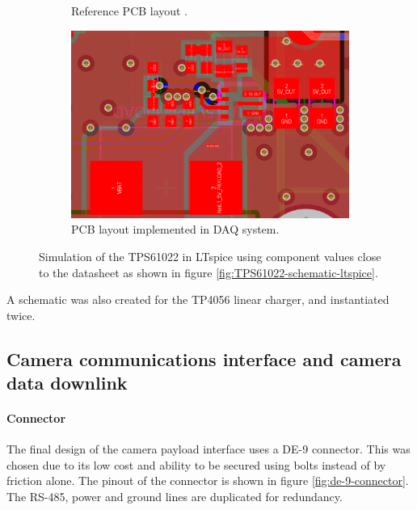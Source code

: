 \documentclass[a4paper,11pt]{article}
\begin{document}
\begin{figure}[H]
  \begin{subfigure}{.5\textwidth}
    \centering
    
    \caption{Reference PCB layout \cite{ti2021tps61022}.}
  \end{subfigure}
  \begin{subfigure}{.5\textwidth}
    \centering
    \includegraphics[width=\linewidth]{images/TPS61022-pcb-layout.svg.png}
    \caption{PCB layout implemented in DAQ system.}
  \end{subfigure}
  \caption{Simulation of the TPS61022 in LTspice using component values close to the datasheet as shown in figure \ref{fig:TPS61022-schematic-ltspice}.}
  \label{fig:TPS61022-layout}
\end{figure}

A schematic was also created for the TP4056 linear charger, and instantiated twice.

\subsection{Camera communications interface and camera data downlink}

\paragraph{Connector}
The final design of the camera payload interface uses a DE-9 connector. This was chosen due to its low cost and ability to be secured using bolts instead of by friction alone. The pinout of the connector is shown in figure \ref{fig:de-9-connector}. The RS-485, power and ground lines are duplicated for redundancy.
\end{document}

